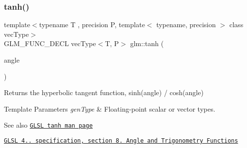 \subsubsection{\texorpdfstring{tanh()}{tanh()}}
{\footnotesize\ttfamily template$<$typename T , precision P, template$<$ typename, precision $>$ class vec\+Type$>$ \\
G\+L\+M\+\_\+\+F\+U\+N\+C\+\_\+\+D\+E\+CL vec\+Type$<$T, P$>$ glm\+::tanh (\begin{DoxyParamCaption}\item[{vec\+Type$<$ T, P $>$ const \&}]{angle }\end{DoxyParamCaption})}

Returns the hyperbolic tangent function, sinh(angle) / cosh(angle)


\begin{DoxyTemplParams}{Template Parameters}
{\em gen\+Type} & Floating-\/point scalar or vector types.\\
\hline
\end{DoxyTemplParams}
\begin{DoxySeeAlso}{See also}
\href{http://www.opengl.org/sdk/docs/manglsl/xhtml/tanh.xml}{\tt G\+L\+SL tanh man page} 

\href{http://www.opengl.org/registry/doc/GLSLangSpec.4.20.8.pdf}{\tt G\+L\+SL 4.. specification, section 8. Angle and Trigonometry Functions} 
\end{DoxySeeAlso}
